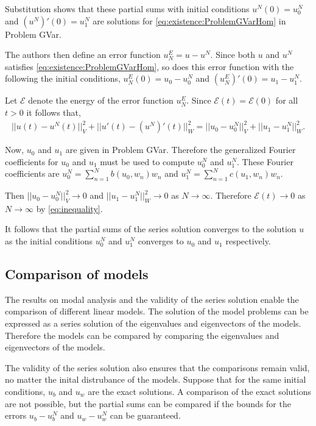 		Substitution shows that these partial sums with initial conditions $u^N(0) = u^N_0$ and $(u^N)'(0) = u^N_1$ are solutions for \eqref{eq:existence:ProblemGVarHom} in Problem GVar.

		The authors then define an error function $u^E_N = u - u^N$. Since both $u$ and $u^N$ satisfies \eqref{eq:existence:ProblemGVarHom}, so does this error function with the following the initial conditions, $u^E_N(0) = u_0 - u^N_0$ and $(u^E_N)'(0) = u_1 - u^N_1$.

		Let $\mathcal{E}$ denote the energy of the error function $u^E_N$. Since $\mathcal{E}(t) = \mathcal{E}(0)$ for all $t>0$ it follows that, 
		\begin{eqnarray}
			||u(t) -  u^N(t)||_V^2 + ||u'(t) - (u^N)'(t)||^2_W = ||u_0 - u^N_0||_V^2 + ||u_1 - u^N_1||_W^2. \label{eq:inequality}
		\end{eqnarray}

		Now, $u_0$ and $u_1$ are given in Problem GVar. Therefore the generalized Fourier coefficients for $u_0$ and $u_1$ must be used to compute $u_0^N$ and $u_1^N$. These Fourier coefficients are $\displaystyle u_0^N = \sum_{n=1}^{N} b(u_0, w_n)w_n$ and $\displaystyle u_1^N = \sum_{n=1}^{N} c(u_1, w_n)w_n$.

		Then $||u_0 - u^N_0||_V^2 \rightarrow 0$ and $||u_1 - u^N_1||_W^2 \rightarrow 0$ as $N \rightarrow \infty$. Therefore $\mathcal{E}(t) \rightarrow 0$ as $N \rightarrow \infty$ by \eqref{eq:inequality}.

		It follows that the partial sums of the series solution converges to the solution $u$ as the initial conditions $u_0^N$ and $u_1^N$ converges to $u_0$ and $u_1$ respectively.

	\subsection*{Comparison of models}
		The results on modal analysis and the validity of the series solution enable the comparison of different linear models. The solution of the model problems can be expressed as a series solution of the eigenvalues and eigenvectors of the models. Therefore the models can be compared by comparing the eigenvalues and eigenvectors of the models.

		The validity of the series solution also ensures that the comparisons remain valid, no matter the inital distrubance of the models. Suppose that for the same initial conditions, $u_b$ and $u_w$ are the exact solutions. A comparison of the exact solutions are not possible, but the partial sums can be compared if the bounds for the errors $u_b - u^N_b$ and $u_w - u^N_w$ can be guaranteed.

